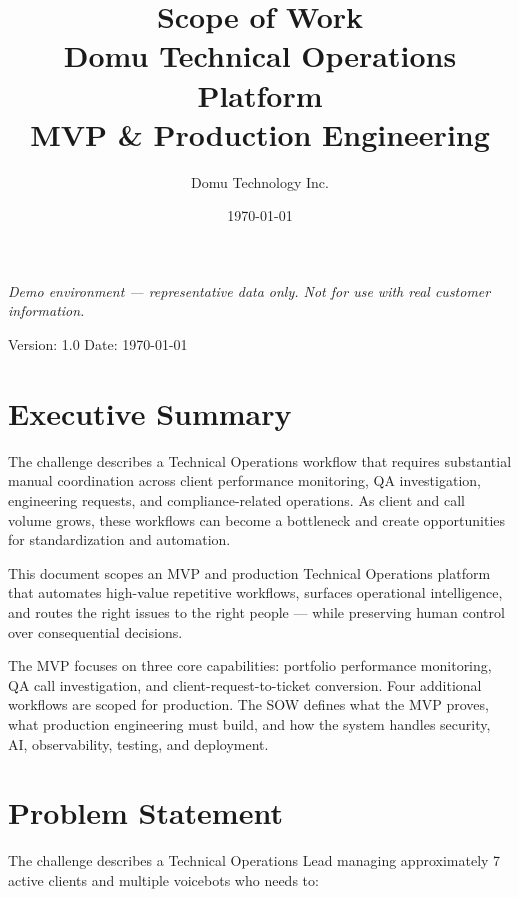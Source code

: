 \documentclass[11pt,a4paper]{article}
\title{\textbf{Scope of Work}\\[4pt]
\large Domu Technical Operations Platform\\[2pt]
\normalsize MVP \& Production Engineering}
\author{Domu Technology Inc.}
\date{\today}
\begin{document}
\maketitle
\thispagestyle{empty}
\begin{center}
\textit{Demo environment — representative data only.
Not for use with real customer information.}
\end{center}
\vfill
\noindent Version: 1.0 \quad Date: \today
\newpage
\tableofcontents
\newpage

\section{Executive Summary}

The challenge describes a Technical Operations workflow that requires substantial manual coordination across client performance monitoring, QA investigation, engineering requests, and compliance-related operations. As client and call volume grows, these workflows can become a bottleneck and create opportunities for standardization and automation.

This document scopes an MVP and production Technical Operations platform that automates high-value repetitive workflows, surfaces operational intelligence, and routes the right issues to the right people — while preserving human control over consequential decisions.

The MVP focuses on three core capabilities: portfolio performance monitoring, QA call investigation, and client-request-to-ticket conversion. Four additional workflows are scoped for production. The SOW defines what the MVP proves, what production engineering must build, and how the system handles security, AI, observability, testing, and deployment.

\section{Problem Statement}

The challenge describes a Technical Operations Lead managing approximately 7 active clients and multiple voicebots who needs to:
\end{document}
